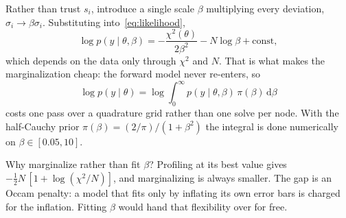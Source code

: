 \documentclass[10pt]{article}
\begin{document}
Rather than trust $s_i$, introduce a single scale $\beta$ multiplying every deviation,
$\sigma_i \to \beta\sigma_i$. Substituting into~\eqref{eq:likelihood},
%
\begin{equation}
\log p(y \mid \theta, \beta)
= -\frac{\chi^2(\theta)}{2\beta^2} - N\log\beta + \text{const},
\label{eq:beta}
\end{equation}
%
which depends on the data only through $\chi^2$ and $N$. That is what makes the
marginalization cheap: the forward model never re-enters, so
%
\begin{equation}
\log p(y\mid\theta) = \log \int_0^\infty p(y \mid \theta,\beta)\,\pi(\beta)\,\mathrm{d}\beta
\label{eq:marginal-beta}
\end{equation}
%
costs one pass over a quadrature grid rather than one solve per node. With the half-Cauchy
prior $\pi(\beta) = (2/\pi)/(1+\beta^2)$ the integral is done numerically on
$\beta\in[0.05,10]$.

Why marginalize rather than fit $\beta$? Profiling at its best value gives
$-\tfrac12 N\,[1 + \log(\chi^2/N)]$, and marginalizing is always smaller. The gap is an
Occam penalty: a model that fits only by inflating its own error bars is charged for the
inflation. Fitting $\beta$ would hand that flexibility over for free.
\end{document}
